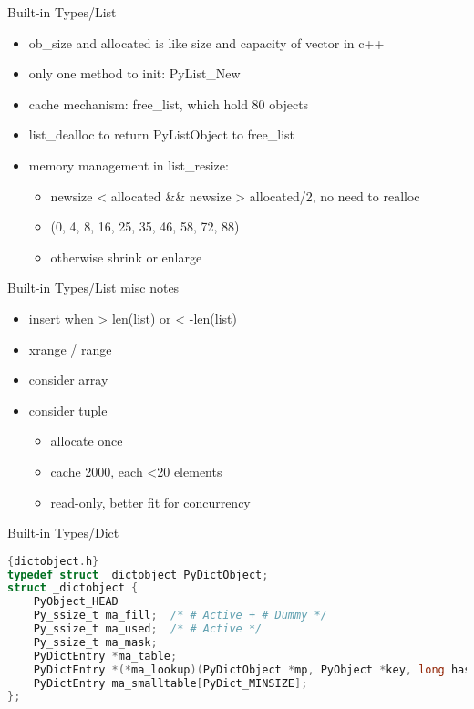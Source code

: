 \documentclass[xcolor=svgnames]{beamer}
\begin{document}
\begin{frame}{Built-in Types/List}
\begin{itemize} 
  \item ob\_size and allocated is like size and capacity of vector in c++
  \item only one method to init: PyList\_New
  \item cache mechanism: free\_list, which hold 80 objects
  \item list\_dealloc to return PyListObject to free\_list
  \item memory management in list\_resize:
    \begin{itemize} 
        \item newsize < allocated \&\& newsize > allocated/2, no need to realloc
        \item (0, 4, 8, 16, 25, 35, 46, 58, 72, 88)
        \item otherwise shrink or enlarge
    \end{itemize} 
\end{itemize} 
\end{frame}

\begin{frame}{Built-in Types/List}
misc notes
\begin{itemize} 
    \item insert when > len(list) or < -len(list)
    \item xrange / range
    \item consider array
    \item consider tuple
        \begin{itemize} 
            \item allocate once
            \item cache 2000, each <20 elements
            \item read-only, better fit for concurrency
        \end{itemize} 
\end{itemize} 
\end{frame}

\begin{frame}[fragile]{Built-in Types/Dict}
\begin{lstlisting}[language=C]{dictobject.h}
typedef struct _dictobject PyDictObject;
struct _dictobject {
    PyObject_HEAD
    Py_ssize_t ma_fill;  /* # Active + # Dummy */
    Py_ssize_t ma_used;  /* # Active */
    Py_ssize_t ma_mask;
    PyDictEntry *ma_table;
    PyDictEntry *(*ma_lookup)(PyDictObject *mp, PyObject *key, long hash);
    PyDictEntry ma_smalltable[PyDict_MINSIZE];
};
\end{lstlisting} 
\end{frame}
\end{document}
